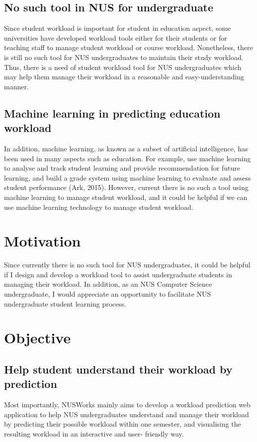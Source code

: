 \documentclass[fyp]{socreport}
\begin{document}
\subsection{No such tool in NUS for undergraduate}
Since student workload is important for student in education aspect, some universities have developed workload tools either for their students or for teaching staff to manage student workload or course workload. Nonetheless, there is still no such tool for NUS undergraduates to maintain their study workload. Thus, there is a need of student workload tool for NUS undergraduates which may help them manage their workload in a reasonable and easy-understanding manner.

\subsection{Machine learning in predicting education workload}
In addition, machine learning, as known as a subset of artificial intelligence, has been used  in many aspects such as education. For example, use machine learning to analyse and track student learning and provide recommendation for future learning, and build a grade system using machine learning to evaluate and assess student performance (Ark, 2015). However, current there is no such a tool using machine learning to manage student workload, and it could be helpful if we can use machine learning technology to manage student workload.

\section{Motivation}
Since currently there is no such tool for NUS undergraduates, it could be helpful if I design and develop a workload tool to assist undergraduate students in managing their workload. In addition, as an NUS Computer Science undergraduate, I would appreciate an opportunity to facilitate NUS undergraduate student learning process.

\section{Objective}
\subsection{Help student understand their workload by prediction}
Most importantly, NUSWorks mainly aims to develop a workload prediction web application to help NUS undergraduates understand and manage their workload by predicting their possible workload within one semester, and visualising the resulting workload in an interactive and user- friendly way.
\end{document}
